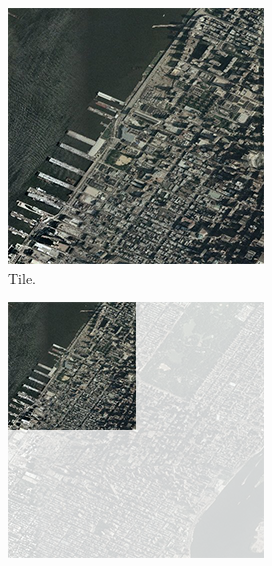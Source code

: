 \begin{figure}[htbp]
    \centering
    \begin{subfigure}[t]{0.3\textwidth}
        \includegraphics[width=\textwidth]{figures/implementation/chunktile/chunktilepile3.png}
        \caption{Tile.}
    \end{subfigure}
    \quad
    \begin{subfigure}[t]{0.3\textwidth}
        \includegraphics[width=\textwidth]{figures/implementation/chunktile/chunktilepile2.png}

\end{subfigure}
\end{figure}

